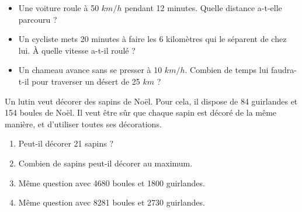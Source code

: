 \documentclass[12pt,a4paper,french,fleqn]{beamer}
\begin{document}
\begin{frame}
        \begin{itemize}
            \item Une voiture roule à 50 $km/h$ pendant 12 minutes. Quelle distance a-t-elle parcouru ?
            \item Un cycliste mets 20 minutes à faire les 6 kilomètres qui le séparent de chez lui. À quelle vitesse a-t-il roulé ?
            \item Un chameau avance sans se presser à 10 $km/h$. Combien de temps lui faudra-t-il pour traverser un désert de 25 $km$ ?
        \end{itemize}
\end{frame}

\begin{frame}
    \begin{center}
        Un lutin veut décorer des sapins de Noël. Pour cela, il dispose de  84 guirlandes et 154 boules de Noël. Il veut être sûr que chaque sapin est décoré de la même manière, et d'utiliser toutes ses décorations.
    \end{center}
    \begin{enumerate}
        \item Peut-il décorer 21 sapins ?
        \item Combien de sapins peut-il décorer au maximum.
        \item Même question avec 4680 boules et 1800 guirlandes.
        \item Même question avec 8281 boules et 2730 guirlandes.
    \end{enumerate}
\end{frame}
\end{document}
